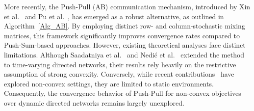 \documentclass{article}
\theoremstyle{plain}
\theoremstyle{definition}
\theoremstyle{remark}
\begin{document}
More recently, the Push-Pull (AB) communication mechanism, introduced by Xin et al.~ and Pu et al.~, has emerged as a robust alternative, as outlined in Algorithm~\ref{Alg_AB}. By employing distinct row- and column-stochastic mixing matrices, this framework significantly improves convergence rates compared to Push-Sum-based approaches. However, existing theoretical analyses face distinct limitations. Although Saadatniya et al.~ and Nedić et al.~ extended the method to time-varying directed networks, their results rely heavily on the restrictive assumption of strong convexity. Conversely, while recent contributions~\cite{yuan_pp2025,pu_pp2025} have explored non-convex settings, they are limited to static environments. Consequently, the convergence behavior of Push-Pull for non-convex objectives over dynamic directed networks remains largely unexplored.


\end{document}
